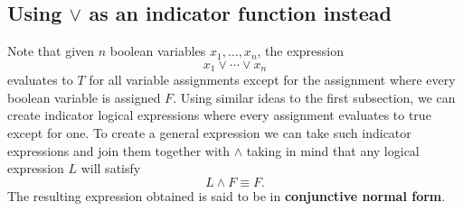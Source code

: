 \subsection{Using $\lor$ as an indicator function instead}

Note that given $n$ boolean variables $x_1, \dots, x_n$, the expression
\[x_1 \lor \cdots \lor x_n\] evaluates to $T$ for all variable assignments except for the assignment where every boolean variable is assigned $F$. Using similar ideas to the first subsection, we can create indicator logical expressions where every assignment evaluates to true except for one. To create a general expression we can take such indicator expressions and join them together with $\land$ taking in mind that any logical expression $L$ will satisfy 
\[L \land F \equiv F.\]
The resulting expression obtained is said to be in \textbf{conjunctive normal form}.